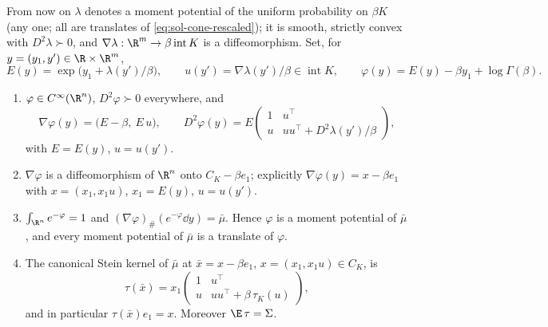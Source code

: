 \documentclass[../main.tex]{subfiles}
\begin{document}
From now on $\lambda$ denotes a moment potential of the uniform probability on $\beta K$
(any one; all are translates of \eqref{eq:sol-cone-rescaled}); it is smooth, strictly convex
with $D^2\lambda\succ0$, and $\nabla\lambda:\R^m\to\beta\operatorname{int}K$ is a
diffeomorphism.  Set, for $y=(y_1,y')\in\R\times\R^m$,
\begin{equation}
  E(y)=\exp\bigl(y_1+\lambda(y')/\beta\bigr),\qquad
  u(y')=\nabla\lambda(y')/\beta\in\operatorname{int}K,\qquad
  \varphi(y)=E(y)-\beta y_1+\log\Gamma(\beta).
  \label{eq:sol-cone-phi}
\end{equation}

\begin{theorem}
\label{thm:sol-cone-A}
\begin{enumerate}[label=(\roman*),leftmargin=2.8em]
  \item $\varphi\in C^\infty(\R^n)$, $D^2\varphi\succ0$ everywhere, and
  \begin{equation}
    \nabla\varphi(y)=\bigl(E-\beta,\ E\,u\bigr),\qquad
    D^2\varphi(y)=E\begin{pmatrix}1&u^\top\\ u&uu^\top+D^2\lambda(y')/\beta\end{pmatrix},
    \label{eq:sol-cone-grad-hess}
  \end{equation}
  with $E=E(y)$, $u=u(y')$.
  \item $\nabla\varphi$ is a diffeomorphism of $\R^n$ onto $C_K-\beta e_1$; explicitly
  $\nabla\varphi(y)=x-\beta e_1$ with $x=(x_1,x_1u)$, $x_1=E(y)$, $u=u(y')$.
  \item $\int_{\R^n}e^{-\varphi}=1$ and $(\nabla\varphi)_\#(e^{-\varphi}\dd y)=\bar\mu$.  Hence
  $\varphi$ is a moment potential of $\bar\mu$, and every moment potential of $\bar\mu$ is a
  translate of $\varphi$.
  \item The canonical Stein kernel of $\bar\mu$ at $\bar x=x-\beta e_1$, $x=(x_1,x_1u)\in C_K$,
  is
  \begin{equation}
    \tau(\bar x)=x_1\begin{pmatrix}1&u^\top\\ u&uu^\top+\beta\,\tau_K(u)\end{pmatrix},
    \label{eq:sol-cone-kernel}
  \end{equation}
  and in particular $\tau(\bar x)e_1=x$.  Moreover $\E\,\tau=\Sigma$.
\end{enumerate}
\end{theorem}
\end{document}
